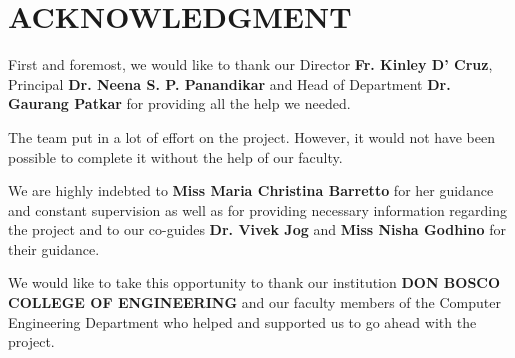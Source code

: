 \chapter*{ACKNOWLEDGMENT}

First and foremost, we would like to thank our Director \textbf{Fr. Kinley D’ Cruz}, 
Principal \textbf{Dr. Neena S. P. Panandikar} and Head of Department \textbf{Dr. Gaurang Patkar} 
for providing all the help we needed.

The team put in a lot of effort on the project. However, it would not have 
been possible to complete it without the help of our faculty.

We are highly indebted to \textbf{Miss Maria Christina Barretto} for her guidance 
and constant supervision as well as for providing necessary information 
regarding the project and to our co-guides \textbf{Dr. Vivek Jog} and \textbf{Miss Nisha 
Godhino} for their guidance.

We would like to take this opportunity to thank our institution 
\textbf{DON BOSCO COLLEGE OF ENGINEERING} and our faculty members of the 
Computer Engineering Department who helped and supported us to 
go ahead with the project.
